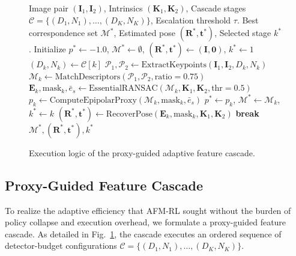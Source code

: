 \documentclass[conference]{IEEEtran}
\begin{document}
\begin{figure}[t]
\centering
\begin{algorithmic}[1]
\REQUIRE Image pair $(\mathbf{I}_1, \mathbf{I}_2)$, Intrinsics $(\mathbf{K}_1, \mathbf{K}_2)$, Cascade stages $\mathcal{C} = \{(D_1, N_1), \dots, (D_K, N_K)\}$, Escalation threshold $\tau$.
\ENSURE Best correspondence set $\mathcal{M}^*$, Estimated pose $(\mathbf{R}^*, \mathbf{t}^*)$, Selected stage $k^*$.
\STATE Initialize $p^* \leftarrow -1.0$, $\mathcal{M}^* \leftarrow \emptyset$, $(\mathbf{R}^*, \mathbf{t}^*) \leftarrow (\mathbf{I}, \mathbf{0})$, $k^* \leftarrow 1$
    \STATE $(D_k, N_k) \leftarrow \mathcal{C}[k]$
    \STATE $\mathcal{P}_1, \mathcal{P}_2 \leftarrow \text{ExtractKeypoints}(\mathbf{I}_1, \mathbf{I}_2, D_k, N_k)$
    \STATE $\mathcal{M}_k \leftarrow \text{MatchDescriptors}(\mathcal{P}_1, \mathcal{P}_2, \text{ratio}=0.75)$
    \STATE $\mathbf{E}_k, \text{mask}_k, \bar{e}_s \leftarrow \text{EssentialRANSAC}(\mathcal{M}_k, \mathbf{K}_1, \mathbf{K}_2, \text{thr}=0.5)$
    \STATE $p_k \leftarrow \text{ComputeEpipolarProxy}(\mathcal{M}_k, \text{mask}_k, \bar{e}_s)$
        \STATE $p^* \leftarrow p_k$, $\mathcal{M}^* \leftarrow \mathcal{M}_k$, $k^* \leftarrow k$
        \STATE $(\mathbf{R}^*, \mathbf{t}^*) \leftarrow \text{RecoverPose}(\mathbf{E}_k, \text{mask}_k, \mathbf{K}_1, \mathbf{K}_2)$
    \ENDIF
        \STATE \textbf{break} 
    \ENDIF
\ENDFOR
\RETURN $\mathcal{M}^*, (\mathbf{R}^*, \mathbf{t}^*), k^*$
\end{algorithmic}
\caption{Execution logic of the proxy-guided adaptive feature cascade.}
\label{fig:cascade_algo}
\end{figure}

\subsection{Proxy-Guided Feature Cascade}
To realize the adaptive efficiency that AFM-RL sought without the burden of policy collapse and execution overhead, we formulate a proxy-guided feature cascade. As detailed in Fig.~\ref{fig:cascade_algo}, the cascade executes an ordered sequence of detector-budget configurations $\mathcal{C} = \{(D_1, N_1), \dots, (D_K, N_K)\}$.
\end{document}
